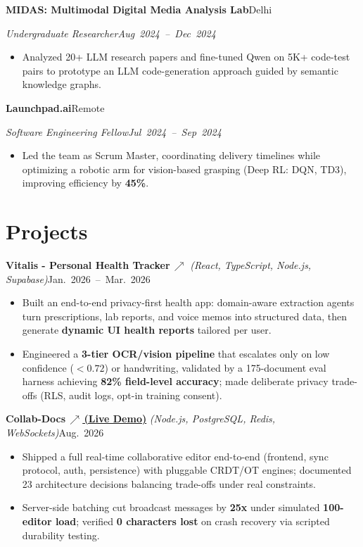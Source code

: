 \documentclass[10pt,letterpaper]{article}
\newcommand{\resumeHeading}[4]{%
  \par\noindent\textbf{#1}\hfill\mbox{#2}\par
  \noindent\textit{#3}\hfill\mbox{\textit{#4}}\par
}
\newcommand{\projectHeading}[3]{%
  \par\noindent\textbf{#1} \textit{(#2)}\hfill\mbox{#3}\par
}
\begin{document}
\resumeHeading{MIDAS: Multimodal Digital Media Analysis Lab}{Delhi}{Undergraduate Researcher}{Aug 2024 -- Dec 2024}
\begin{itemize}
\item Analyzed 20+ LLM research papers and fine-tuned Qwen on 5K+ code-test pairs to prototype an LLM code-generation approach guided by semantic knowledge graphs.
\end{itemize}

\resumeHeading{Launchpad.ai}{Remote}{Software Engineering Fellow}{Jul 2024 -- Sep 2024}
\begin{itemize}
\item Led the team as Scrum Master, coordinating delivery timelines while optimizing a robotic arm for vision-based grasping (Deep RL: DQN, TD3), improving efficiency by \textbf{45\%}.
\end{itemize}

\section{Projects}
\projectHeading{Vitalis - Personal Health Tracker\,\href{https://vitalis-aitracker.vercel.app/}{\scriptsize$\nearrow$}}{React, TypeScript, Node.js, Supabase}{Jan. 2026 -- Mar. 2026}
\begin{itemize}
  \item Built an end-to-end privacy-first health app: domain-aware extraction agents turn prescriptions, lab reports, and voice memos into structured data, then generate \textbf{dynamic UI health reports} tailored per user.
  \item Engineered a \textbf{3-tier OCR/vision pipeline} that escalates only on low confidence ($<0.72$) or handwriting, validated by a 175-document eval harness achieving \textbf{82\% field-level accuracy}; made deliberate privacy trade-offs (RLS, audit logs, opt-in training consent).
\end{itemize}

\projectHeading{Collab-Docs\,\href{https://collab-client-kvn5.onrender.com/}{\textnormal{\scriptsize$\nearrow$\,\normalsize (Live Demo)}}}{Node.js, PostgreSQL, Redis, WebSockets}{Aug. 2026}
\begin{itemize}
  \item Shipped a full real-time collaborative editor end-to-end (frontend, sync protocol, auth, persistence) with pluggable CRDT/OT engines; documented 23 architecture decisions balancing trade-offs under real constraints.
  \item Server-side batching cut broadcast messages by \textbf{25x} under simulated \textbf{100-editor load}; verified \textbf{0 characters lost} on crash recovery via scripted durability testing.
\end{itemize}
\end{document}
